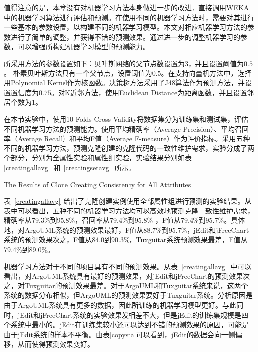 值得注意的是，本章没有对机器学习方法本身做进一步的改进，直接调用WEKA中的机器学习算法进行评估和预测。在使用不同的机器学习方法时，需要对其进行一些基本的参数设置，以构建不同的机器学习模型。本文对相应机器学习方法的参数进行了简单的调整，并获得不错的预测效果。通过进一步的调整机器学习的参数，可以增强所构建机器学习模型的预测能力。

所采用方法的参数设置如下：贝叶斯网络的父节点数设置为$3$，并且设置阈值为$0.5$。 朴素贝叶斯方法只有一个父节点，设置阈值为$0.5$。在支持向量机方法中，选择用Polynomial Kernel作为核函数。决策树方法采用了J48算法作为预测方法，并设置置信度为$0.75$。对K近邻方法，使用Euclidean Distance为距离函数，并且设置邻居个数为$1$。

在本节实验中，使用10-Folds Cross-Validity将数据集分为训练集和测试集，评估不同机器学习方法的预测能力。使用平均精确率（Average Precision）、平均召回率（Average Recall）和平均F值（Average F-measure）作为评价指标。采用五种不同的机器学习方法，预测克隆创建的克隆代码的一致性维护需求，实验分成了两个部分，分别为全属性实验和属性组实验，实验结果分别如表\ref{creatingallavg}~和~\ref{creatingsetavg}~所示。

{The Results of Clone Creating Consistency for All Attributes}

表~\ref{creatingallavg}~给出了克隆创建实例使用全部属性组进行预测的实验结果。从表中可以看出，五种不同的机器学习方法均可以高效地预测克隆一致性维护需求，精确率从79.3\%到95.8\%，召回率从79.4\%到95.8\% ，F值从79.4\%到95.7\%。具体地，对ArgoUML系统的预测效果最好，F值从88.7\%到95.7\%，jEdit和jFreeChart系统的预测效果次之，F值从84.0到90.3\%，Tuxguitar系统预测效果最差，F值从79.4\%到89.0\%。

机器学习方法对于不同的项目具有不同的预测效果。从表~\ref{creatingallavg}~中可以看出，对ArgoUML系统具有最好的预测效果，对jEdit和jFreeChart的预测效果次之，对Tuxguitar的预测效果最差。对于ArgoUML和Tuxguitar系统来说，这两个系统的数据分布相似，但ArgoUML的预测效果要好于Tuxguitar系统。分析原因是由于ArgoUML系统具有更多的数据，因此所训练的机器学习模型更好。与此同时，jEdit和jFreeChart系统的实验效果发相差不大，但是jEdit的训练集规模是四个系统中最小的。jEdit在训练集较小还可以达到不错的预测效果的原因，可能是由于jEdit系统的样本不平衡。由表\ref{copysta}可以看到，jEdit的数据会向一侧偏移，从而使得预测效果变好。

